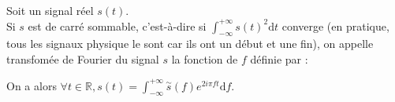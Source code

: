 \documentclass[a4paper]{article}
\begin{document}
\pagestyle{fancy}
\fancyhf{}
\setlength{\headheight}{15pt}

\begin{center}
	\large{}
\end{center}


Soit un signal réel \(s(t)\).\\
Si \(s\) est de carré sommable, c'est-à-dire si \(\displaystyle\int_{-\infty}^{+\infty}s(t)^2\mathrm{d}t\) converge (en pratique, tous les signaux physique le sont car ils ont un début et une fin), on appelle transfomée de Fourier du signal \(s\) la fonction de \(f\) définie par :\begin{center}
\end{center}
On a alors \(\forall t\in\mathbb{R},s(t)=\displaystyle\int_{-\infty}^{+\infty}\overset{\sim}{s}(f)e^{2i\pi ft}\mathrm{d}f\).
\end{document}
